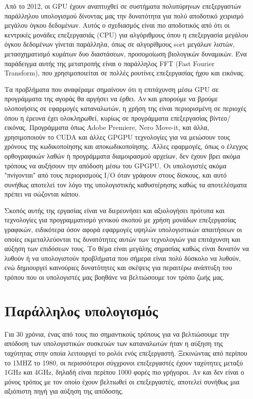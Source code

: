 Από το 2012, οι GPU έχουν αναπτυχθεί σε συστήματα πολυπύρηνων επεξεργαστών παράλληλου υπολογισμού δίνοντας μας την δυνατότητα για πολύ αποδοτικό χειρισμό μεγάλου όγκου δεδομένων. Αυτός ο σχεδιασμός είναι πιο αποδοτικός από ότι οι κεντρικές μονάδες επεξεργασιάς (CPU) για αλγόριθμους όπου η επεξεργασία μεγάλου όγκου δεδομένων γίνεται παράλληλα, όπως σε αλγορίθμους sort μεγάλων λιστών, μετασχηματισμό κυμάτων δυο διαστάσεων, προσομοίωση βιολογικών δυναμικών. Ένα παράδειγμα αυτής της μετατροπής είναι ο παράλληλος FFT (Fast Fourier Transform), που χρησιμοποιείται σε πολλές ρουτίνες επεξεργασίας ήχου και εικόνας.

Τα προβλήματα που αναφέραμε σημαίνουν ότι η επιτάχυνση μέσω GPU σε προγράμματα της αγοράς θα αργήσει να έρθει. Αν και μπορούμε να βρούμε υλοποιήσεις σε εφαρμογές καταναλωτών, η χρήση της είναι περιορισμένη σε περιοχές όπου η έρευνα έχει ολοκληρωθεί, κυρίως σε προγράμματα επεξεργασίας βίντεο/εικόνας. Προγράμματα όπως Adobe Premiere, Nero Move-it, και άλλα, χρησιμοποιούν το CUDA και άλλες GPGPU τεχνολογίες για να μειώσουν τους χρόνους της κωδικοποίησης και αποκωδικοποίησης. Άλλες εφαρμογές, όπως ο έλεγχος ορθογραφικών λαθών ή προγράμματα διαμοιρασμού αρχείων, δεν έχουν βρει ακόμα τρόπους να αυξήσουν την απόδοση μέσω του GPGPU. Οι υπολογιστές ακόμα "πνίγονται" από τους περιορισμούς I/O όταν γράφουν στους δίσκους, και αυτό συνήθως αποτελεί τον λόγο της υπολογιστικής καθυστέρησης καθώς τα αποτελέσματα πρέπει να σώζονται κάπου.\cite{gpgpu-2}

Σκοπός αυτής της εργασίας είναι να διερευνήσει και αξιολογήσει πρότυπα και τεχνολογίες για προγραμματισμό γενικού σκοπού με χρήση μονάδων επεξεργασίας γραφικών, ειδικότερα όσον αφορά εφαρμογές υψηλών υπολογιστικών απαιτήσεων οι οποίες εκμεταλλεύονται τις δυνατότητες αυτών των τεχνολογιών για επιτάχυνση και αύξηση των επιδόσεων τους. Το θέμα είναι μεγάλης σημασίας καθώς είναι δυνατόν να λυθούν ή να υπολογιστούν προβλήματα που σήμερα είναι πολύ δύσκολο να λυθούν, ενώ δημιουργεί καινούριες δυνατότητες και σκέψεις για περαιτέρω ανάπτυξη του τρόπου που οι υπολογιστές μας βοηθάνε να βελτιώσουμε τον τρόπο ζωής μας.

\section*{Παράλληλος υπολογισμός}
Για 30 χρόνια, ένας από τους πιο σημαντικούς τρόπους για να βελτιώσουμε την απόδοση των υπολογιστικών συσκευών των καταναλωτών ήταν η αύξηση της ταχύτητας στην οποία λειτουργεί το ρολόι ενός επεξεργαστή. Ξεκινώντας από περίπου το 1MHZ το 1980, οι περισσότεροι σύγχρονοι επεξεργαστές έχουν ταχύτητες μεταξύ 1GHz και 4GHz, δηλαδή είναι περίπου 1000 φορές πιο γρήγοροι. Αν και δεν είναι ο μόνος τρόπος με τον οποίο έχουν βελτιωθεί οι επεξεργαστές, αποτελεί συνήθως μια αξιόπιστη πηγή για αύξηση της απόδοσης.

